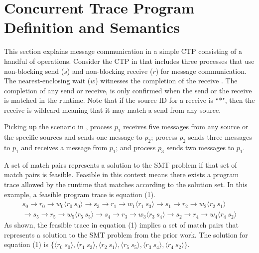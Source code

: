 \section{Concurrent Trace Program Definition and Semantics}

\examplefigone

This section explains message communication in a simple CTP consisting of a handful of operations. Consider the CTP in  that includes three processes that use non-blocking send ($s$) and non-blocking receive ($r$) for message communication. The nearest-enclosing wait ($w$) witnesses the completion of the receive \cite{DBLP:conf/kbse/HuangMM13}. The completion of any send or receive, is only confirmed when the send or the receive is matched in the runtime. Note that if the source ID for a receive is ``$\ast$", then the receive is wildcard meaning that it may match a send from any source. 

Picking up the scenario in , process $p_1$ receives five messages from any source or the specific sources and sends one message to $p_2$; process $p_2$ sends three messages to $p_1$ and receives a message from $p_1$; and process $p_3$ sends two messages to $p_1$. 


A set of match pairs represents a solution to the SMT problem if that set of match pairs is feasible. 
Feasible in this context means there exists a program trace allowed by the runtime that matches according to the solution set. In this example, a feasible program trace is equation (1). 
\begin{equation}
\begin{split}
s_0\rightarrow r_0\rightarrow w_0\langle r_0\ s_0\rangle \rightarrow s_3\rightarrow r_1\rightarrow w_1\langle r_1\ s_3\rangle \rightarrow s_1\rightarrow r_2\rightarrow w_2\langle r_2\ s_1\rangle \\
\rightarrow s_5\rightarrow r_5\rightarrow w_5\langle r_5\ s_5\rangle \rightarrow s_4\rightarrow r_3\rightarrow w_3\langle r_3\ s_4\rangle \rightarrow s_2\rightarrow r_4\rightarrow w_4\langle r_4\ s_2\rangle
\end{split}
\end{equation} 
As shown, the feasible trace in equation (1) implies a set of match pairs that represents a solution to the SMT problem from the prior work. The solution for equation (1) is $\{\langle r_0\ s_0\rangle, \langle r_1\ s_3\rangle, \langle r_2\ s_1\rangle, \langle r_5\ s_5\rangle, \langle r_3\ s_4\rangle, \langle r_4\ s_2\rangle\}$.


